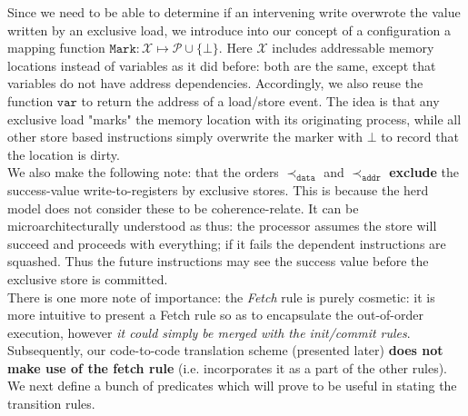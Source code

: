 \documentclass{article}
\newcommand{\var}{\texttt}
\begin{document}
Since we need to be able to determine if an intervening write overwrote the value written by an exclusive load, we introduce into our concept of a configuration a mapping function $\var{Mark}: \mathcal{X} \mapsto \mathcal{P} \cup \{\bot\}$. Here $\mathcal{X}$ includes addressable memory locations instead of variables as it did before: both are the same, except that variables do not have address dependencies. Accordingly, we also reuse the function $\var{var}$ to return the address of a load/store event. The idea is that any exclusive load "marks" the memory location with its originating process, while all other store based instructions simply overwrite the marker with $\bot$ to record that the location is dirty.\\
We also make the following note: that the orders $\prec_\var{data}$ and $\prec_\var{addr}$ \textbf{exclude} the success-value write-to-registers by exclusive stores. This is because the herd model does not consider these to be coherence-relate. It can be microarchitecturally understood as thus: the processor assumes the store will succeed and proceeds with everything; if it fails the dependent instructions are squashed. Thus the future instructions may see the success value before the exclusive store is committed. \\
There is one more note of importance: the \textit{Fetch} rule is purely cosmetic: it is more intuitive to present a Fetch rule so as to encapsulate the out-of-order execution, however \textit{it could simply be merged with the init/commit rules}. Subsequently, our code-to-code translation scheme (presented later) \textbf{does not make use of the fetch rule} (i.e. incorporates it as a part of the other rules).\\
We next define a bunch of predicates which will prove to be useful in stating the transition rules.\\
\end{document}
